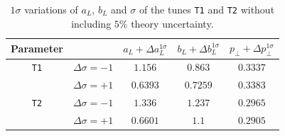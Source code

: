 \documentclass[aps,preprint,floatfix,nofootinbib,showpacs]{revtex4-1}
\begin{document}
\begin{table}[!h]
 \begin{center}
 \begin{tabular}{ c | c | c | c | c  }
 \hline \hline
  Parameter   & & \hspace{0.4cm} $a_L + \Delta a_L^{1\sigma}$ \hspace{0.4cm}   & \hspace{0.4cm} $b_L + \Delta b_L^{1\sigma}$ \hspace{0.4cm} & \hspace{0.4cm} $p_\perp + \Delta p_\perp^{1\sigma}$ \hspace{0.4cm} \\ \hline \hline
  \texttt{T1} & $\Delta\sigma=-1$ \hspace{0.5cm}  & $1.156$   & $0.863$  & $0.3337$ \\ 
              & $\Delta\sigma=+1$ \hspace{0.5cm}  & $0.6393$  & $0.7259$ & $0.3383$ \\ \hline \hline
  \texttt{T2} & $\Delta\sigma=-1$ \hspace{0.5cm}  & $1.336$   & $1.237$  & $0.2965$ \\ 
              & $\Delta\sigma=+1$ \hspace{0.5cm}  & $0.6601$  & $1.1$    & $0.2905$ \\ \hline \hline
 \end{tabular}
 \end{center}
 \caption{$1\sigma$ variations of $a_L$, $b_L$ and $\sigma$ of the tunes \texttt{T1} and \texttt{T2} without
 including $5\%$ theory uncertainty.}
 \label{Table.variations_without-uncertainty}
\end{table}

\clearpage
\end{document}

